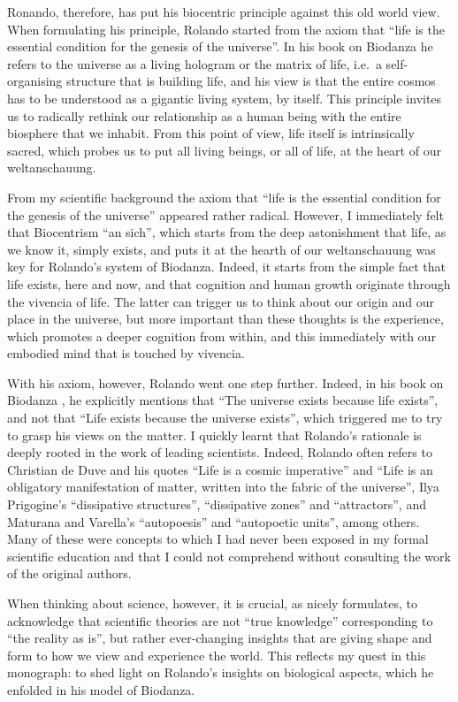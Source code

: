 \documentclass[
  11pt,
]{book}
\begin{document}
Ronando, therefore, has put his biocentric principle against this old world view. When formulating his principle, Rolando started from the axiom that ``life is the essential condition for the genesis of the universe''. In his book on Biodanza \citep{toro2008} he refers to the universe as a living hologram or the matrix of life, i.e.~a self-organising structure that is building life, and his view is that the entire cosmos has to be understood as a gigantic living system, by itself. This principle invites us to radically rethink our relationship as a human being with the entire biosphere that we inhabit. From this point of view, life itself is intrinsically sacred, which probes us to put all living beings, or all of life, at the heart of our weltanschauung.

From my scientific background the axiom that ``life is the essential condition for the genesis of the universe'' appeared rather radical. However, I immediately felt that Biocentrism ``an sich'', which starts from the deep astonishment that life, as we know it, simply exists, and puts it at the hearth of our weltanschauung was key for Rolando's system of Biodanza. Indeed, it starts from the simple fact that life exists, here and now, and that cognition and human growth originate through the vivencia of life. The latter can trigger us to think about our origin and our place in the universe, but more important than these thoughts is the experience, which promotes a deeper cognition from within, and this immediately with our embodied mind that is touched by vivencia.

With his axiom, however, Rolando went one step further. Indeed, in his book on Biodanza \citep{toro2008}, he explicitly mentions that ``The universe exists because life exists'', and not that ``Life exists because the universe exists'', which triggered me to try to grasp his views on the matter. I quickly learnt that Rolando's rationale is deeply rooted in the work of leading scientists. Indeed, Rolando often refers to Christian de Duve and his quotes ``Life is a cosmic imperative'' and ``Life is an obligatory manifestation of matter, written into the fabric of the universe'', Ilya Prigogine's ``dissipative structures'', ``dissipative zones'' and ``attractors'', and Maturana and Varella's ``autopoesis'' and ``autopoetic units'', among others. Many of these were concepts to which I had never been exposed in my formal scientific education and that I could not comprehend without consulting the work of the original authors.

When thinking about science, however, it is crucial, as \citet{bohm1980} nicely formulates, to acknowledge that scientific theories are not ``true knowledge'' corresponding to ``the reality as is'', but rather ever-changing insights that are giving shape and form to how we view and experience the world. This reflects my quest in this monograph: to shed light on Rolando's insights on biological aspects, which he enfolded in his model of Biodanza.
\end{document}
